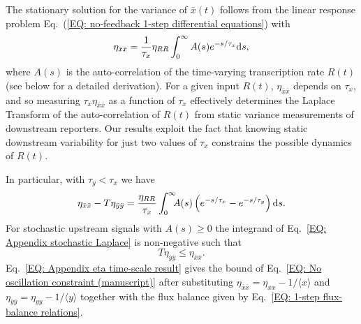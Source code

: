 \documentclass[%
 reprint,prx,
superscriptaddress,
%
%
%
%
%
%
%
%
%
 amsmath,amssymb,
 aps,
%
%
%
%
%
%
]{revtex4-2}
\newcommand{\lb}{\langle}
\newcommand{\rb}{\rangle}
\begin{document}
The stationary solution for the variance of $\bar{x}(t)$ follows from the linear response problem Eq.~(\ref{EQ: no-feedback 1-step differential equations}) with
\begin{align}
 \eta_{\bar{x}\bar{x}} = \frac{1}{\tau_{x}}\eta_{RR}\int_{0}^{\infty} A(s) e^{-s/\tau_{x}}  \mathrm{d} s,
 \label{EQ: no-oscillation 1-step eta bar autocorrelation integral}
\end{align}
%
where $A(s)$ is the auto-correlation of the time-varying transcription rate $R(t)$ (see below for a detailed derivation). For a given input $R(t)$, $\eta_{\bar{x}\bar{x}}$ depends on $\tau_{x}$, and so measuring $\tau_{x}\eta_{\bar{x}\bar{x}}$ as a function of $\tau_{x}$ effectively determines the Laplace Transform of the auto-correlation of $R(t)$ from static variance measurements of downstream reporters. Our results exploit the fact that knowing static downstream variability for just two values of $\tau_x$ constrains the possible dynamics of $R(t)$.
%
%

In particular, with $\tau_{y} < \tau_{x}$ we have 
\begin{align}
    \eta_{\bar{x}\bar{x}} - T\eta_{\bar{y}\bar{y}} = \frac{\eta_{RR}}{\tau_{x}}\int_{0}^{\infty}\hspace{-0.5em}A(s)\left(e^{-s/\tau_{x}} - e^{-s/\tau_{y}}\right) \mathrm{d} s . 
    \label{EQ: Appendix stochastic Laplace}
\end{align}
For stochastic upstream signals with $A(s) \geq 0$ the integrand of Eq.~\eqref{EQ: Appendix stochastic Laplace} is non-negative such that 
\begin{equation}
T \eta_{\bar{y}\bar{y}} \leq \eta_{\bar{x}\bar{x}} .
\label{EQ: Appendix eta time-scale result}
\end{equation}
Eq.~\eqref{EQ: Appendix eta time-scale result} gives the bound of Eq.~\eqref{EQ: No oscillation constraint (manuscript)} after substituting $\eta_{\bar{x}\bar{x}}= \eta_{xx}-1/\lb x \rb$ and $\eta_{\bar{y}\bar{y}}= \eta_{yy}-1/\lb y \rb$ together with the flux balance given by Eq.~\eqref{EQ: 1-step flux-balance relations}.
%
%
%
\end{document}
